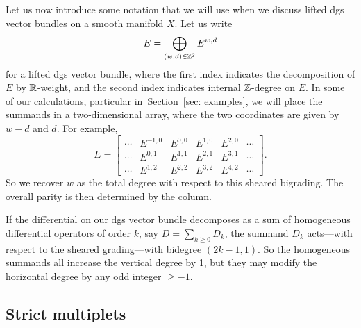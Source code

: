 \documentclass[11pt]{article}
\numberwithin{equation}{section}
\numberwithin{equation}{section}
\begin{document}
Let us now introduce some notation that we will use when we discuss lifted dgs vector bundles on a smooth manifold $X$. Let us write
\begin{equation*}
E = \bigoplus_{(w,d) \in \mathbb Z^2} E^{w,d}
\end{equation*}
for a lifted dgs vector bundle, where the first index indicates the decomposition of $E$ by $\mathbb R$-weight, and the second index indicates internal $\mathbb Z$-degree on $E$. In some of our calculations, particular in~Section~\ref{sec: examples}, we will place the summands in a two-dimensional array, where the two coordinates are given by $w-d$ and $d$. For example,
\begin{equation*}
E =
\begin{bmatrix}
\cdots &E^{-1,0} &E^{0,0} &E^{1,0} &E^{2,0}&\cdots\\
\cdots &E^{0,1} &E^{1,1} &E^{2,1} &E^{3,1}&\cdots\\
\cdots &E^{1,2} &E^{2,2} &E^{3,2} &E^{4,2} &\cdots
\end{bmatrix}.
\end{equation*}
So we recover $w$ as the total degree with respect to this sheared bigrading. The overall parity is then determined by the column.

If the differential on our dgs vector bundle decomposes as a sum of homogeneous differential operators of order $k$, say $D = \sum_{k \ge 0} D_k$, the summand $D_k$ acts---with respect to the sheared grading---with bidegree $(2k-1, 1)$. So the homogeneous summands all increase the vertical degree by 1, but they may modify the horizontal degree by any odd integer $\ge -1$.

\subsection{Strict multiplets}
\end{document}
